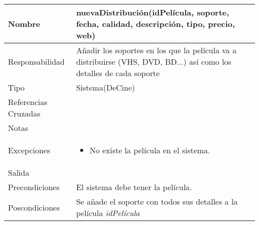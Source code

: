 \documentclass{article}
\begin{document}
\begin{table}[h]
\begin{tabular}{|l|l|l|l|l|l|}
\hline
\multicolumn{2}{|p{3cm}|}{Nombre} & \multicolumn{4}{p{10cm}|}{\textbf{nuevaDistribución(idPelícula, soporte, fecha, calidad, descripción, tipo, precio, web)}}\\
\hline
\multicolumn{2}{|p{3cm}|}{Responsabilidad} & \multicolumn{4}{p{10cm}|}{Añadir los soportes en los que la película va a distribuirse (VHS, DVD, BD...) así como los detalles de cada soporte} \\
\hline
\multicolumn{2}{|p{3cm}|}{Tipo} & \multicolumn{4}{p{10cm}|}{Sistema(DeCine)} \\
\hline
\multicolumn{2}{|p{3cm}|}{Referencias Cruzadas} & \multicolumn{4}{p{10cm}|}{} \\
\hline
\multicolumn{2}{|p{3cm}|}{Notas} & \multicolumn{4}{p{10cm}|}{} \\
\hline
\multicolumn{2}{|p{3cm}|}{Excepciones} & \multicolumn{4}{p{10cm}|}{\begin{itemize}
\item No existe la película en el sistema.
\end{itemize}} \\
\hline
\multicolumn{2}{|p{3cm}|}{Salida} & \multicolumn{4}{p{10cm}|}{} \\
\hline
\multicolumn{2}{|p{3cm}|}{Precondiciones} & \multicolumn{4}{p{10cm}|}{El sistema debe tener la película.} \\
\hline
\multicolumn{2}{|p{3cm}|}{Poscondiciones} & \multicolumn{4}{p{10cm}|}{Se añade el soporte con todos sus detalles a la película \textit{idPelícula}} \\
\hline
\end{tabular}
\end{table}
\end{document}
